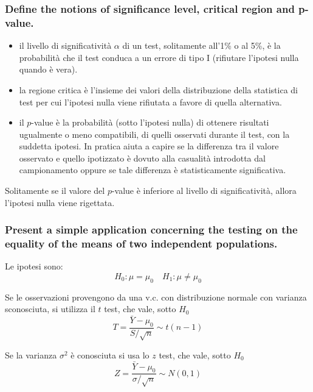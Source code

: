\documentclass[
]{article}
\begin{document}
\hypertarget{define-the-notions-of-significance-level-critical-region-and-p-value.}{%
\subsubsection{Define the notions of significance level, critical region
and
p-value.}\label{define-the-notions-of-significance-level-critical-region-and-p-value.}}

\begin{itemize}
\item
  il livello di significatività \(\alpha\) di un test, solitamente
  all'1\% o al 5\%, è la probabilità che il test conduca a un errore di
  tipo I (rifiutare l'ipotesi nulla quando è vera).
\item
  la regione critica è l'insieme dei valori della distribuzione della
  statistica di test per cui l'ipotesi nulla viene rifiutata a favore di
  quella alternativa.
\item
  il \(p\)-value è la probabilità (sotto l'ipotesi nulla) di ottenere
  risultati ugualmente o meno compatibili, di quelli osservati durante
  il test, con la suddetta ipotesi. In pratica aiuta a capire se la
  differenza tra il valore osservato e quello ipotizzato è dovuto alla
  casualità introdotta dal campionamento oppure se tale differenza è
  statisticamente significativa.
\end{itemize}

Solitamente se il valore del \(p\)-value è inferiore al livello di
significatività, allora l'ipotesi nulla viene rigettata.

\hypertarget{present-a-simple-application-concerning-the-testing-on-the-equality-of-the-means-of-two-independent-populations.}{%
\subsubsection{Present a simple application concerning the testing on
the equality of the means of two independent
populations.}\label{present-a-simple-application-concerning-the-testing-on-the-equality-of-the-means-of-two-independent-populations.}}

Le ipotesi sono: \[H_0 : \mu = \mu_0 \quad H_1 : \mu \neq \mu_0\]

Se le osservazioni provengono da una v.c. con distribuzione normale con
varianza sconosciuta, si utilizza il \(t\) test, che vale, sotto \(H_0\)
\[ T = \frac{\bar{Y} - \mu_0}{S/\sqrt{n}} \sim t(n-1) \]

Se la varianza \(\sigma^2\) è conosciuta si usa lo \(z\) test, che vale,
sotto \(H_0\)
\[ Z = \frac{\bar{Y} - \mu_0}{\sigma/\sqrt{n}} \sim N(0,1) \]
\end{document}
